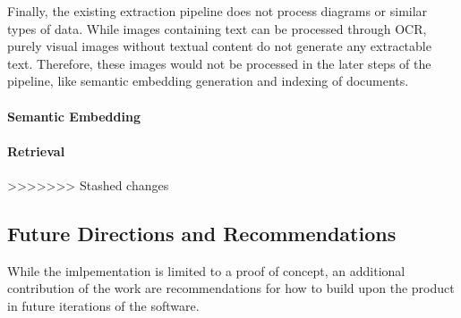 Finally, the existing extraction pipeline does not process diagrams or similar types of data. 
While images containing text can be processed through OCR, purely visual images without textual content do not generate any extractable text. 
Therefore, these images would not be processed in the later steps of the pipeline, like semantic embedding generation and indexing of documents.


\paragraph{Semantic Embedding}

\paragraph{Retrieval}
>>>>>>> Stashed changes

\subsection{Future Directions and Recommendations}

While the imlpementation is limited to a proof of concept, an additional contribution of the work are recommendations for how to build upon the product in future iterations of the software.


